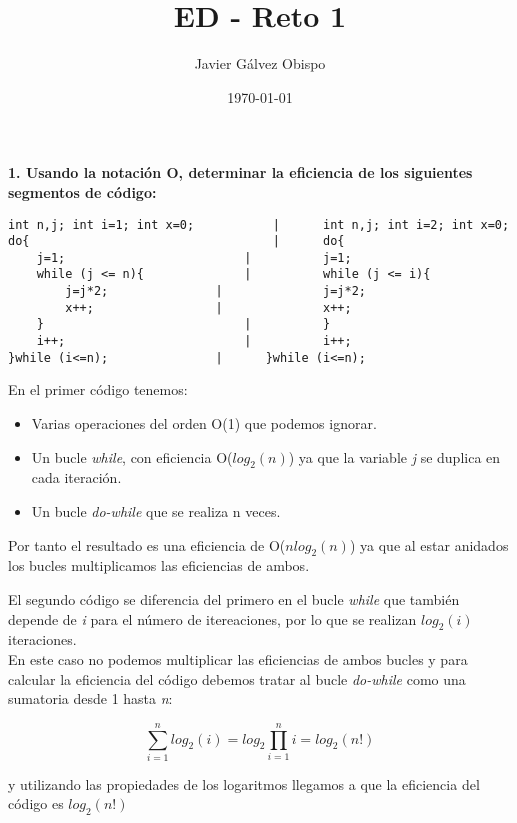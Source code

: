 \documentclass{article}
\begin{document}
\title{\Huge ED - Reto 1}
\author{\Large Javier Gálvez Obispo}
\date{\large\today}
\maketitle


\begin{flushleft}
{\large\textbf{1. Usando la notación O, determinar la eficiencia de los siguientes segmentos  de  código:}}

\begin{lstlisting}
int n,j; int i=1; int x=0;           |      int n,j; int i=2; int x=0;
do{                                  |      do{
	j=1;                         |      	j=1;
	while (j <= n){              |      	while (j <= i){
		j=j*2;               |      		j=j*2;
		x++;                 |      		x++;
	}                            |      	}
	i++;                         |      	i++;
}while (i<=n); 			     |	    }while (i<=n);
\end{lstlisting}

\vspace{\baselineskip}

En el primer código tenemos:
\begin{itemize}
	\item Varias operaciones del orden O(1) que podemos ignorar.
	\item Un bucle \textit{while}, con eficiencia O($log_{2}(n)$) ya que la variable \textit{j} se duplica en cada iteración.
	\item Un bucle \textit{do-while} que se realiza n veces.
\end{itemize}

Por tanto el resultado es una eficiencia de O($n log_{2}(n)$) ya que al estar anidados
los bucles multiplicamos las eficiencias de ambos.

\vspace{\baselineskip} \vspace{\baselineskip}
El segundo código se diferencia del primero en el bucle \textit{while} que
también depende de \textit{i} para el número de itereaciones, por lo que se realizan $log_{2}(i)$ iteraciones.\\
En este caso no podemos multiplicar las eficiencias de ambos bucles y para calcular la
eficiencia del código debemos tratar al bucle \textit{do-while} como una sumatoria desde 1 hasta \textit{n}:

	 $$\sum\limits_{i=1}^{n}{log_{2}(i)} = log_{2}{\prod\limits_{i=1}^{n}i} = log_{2}(n!)$$

y utilizando las propiedades de los logaritmos llegamos a que la eficiencia del código es $log_{2}(n!)$

\vspace{\baselineskip}
\end{flushleft}
\end{document}
